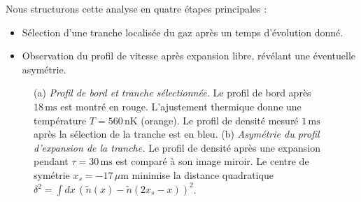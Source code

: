 \medskip

{\color{blue}
Nous structurons cette analyse en quatre étapes principales :
\begin{itemize}
    \item Sélection d’une tranche localisée du gaz après un temps d’évolution donné.
    \item Observation du profil de vitesse après expansion libre, révélant une éventuelle asymétrie.
\end{itemize}
}

\begin{figure}[!htb]
\centering
{}
\caption{(a) {\it Profil de bord et tranche sélectionnée.} Le profil de bord après $18\,\mathrm{ms}$ est montré en rouge. L'ajustement thermique donne une température $T = 560\,\mathrm{nK}$ (orange). Le profil de densité mesuré $1\,\mathrm{ms}$ après la sélection de la tranche est en bleu. (b) {\it Asymétrie du profil d’expansion de la tranche.} Le profil de densité après une expansion pendant $\tau = 30\,\mathrm{ms}$ est comparé à son image miroir. Le centre de symétrie $x_s = -17\,\mu$m minimise la distance quadratique $\delta^2 = \int dx\, (\tilde{n}(x) - \tilde{n}(2x_s - x))^2$.}
\label{fig:simul_deformation}
\end{figure}



